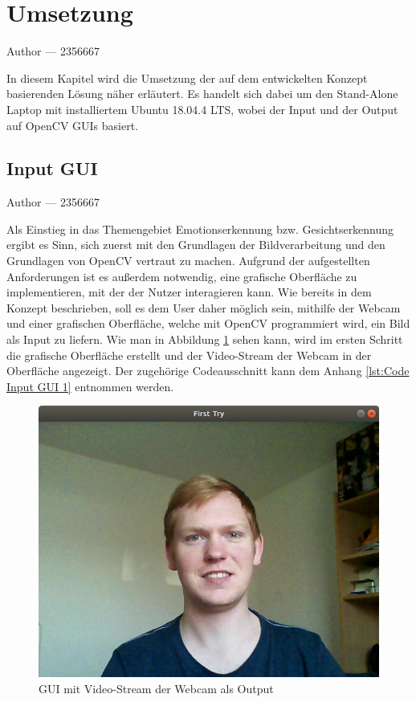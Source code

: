 \documentclass[12pt, a4paper]{report}
\makeatletter
\newcommand{\sectionauthor}[1]{%
  {\parindent0pt\vspace*{-5pt}%
  \large{Author --- }
  \linespread{1.1}\large\scshape#1%
  \par\nobreak\vspace*{35pt} }
  \@afterheading%
}
\makeatother
\begin{document}
\section{Umsetzung}
\sectionauthor{2356667}
In diesem Kapitel wird die Umsetzung der auf dem entwickelten Konzept basierenden Lösung näher erläutert. Es handelt sich dabei um den Stand-Alone Laptop mit installiertem Ubuntu 18.04.4 LTS, wobei der Input und der Output auf OpenCV GUIs basiert.

\subsection{Input GUI}
\sectionauthor{2356667}
Als Einstieg in das Themengebiet Emotionserkennung bzw. Gesichtserkennung ergibt es Sinn, sich zuerst mit den Grundlagen der Bildverarbeitung und den Grundlagen von OpenCV vertraut zu machen. Aufgrund der aufgestellten Anforderungen ist es außerdem notwendig, eine grafische Oberfläche zu implementieren, mit der der Nutzer interagieren kann. Wie bereits in dem Konzept beschrieben, soll es dem User daher möglich sein, mithilfe der Webcam und einer grafischen Oberfläche, welche mit OpenCV programmiert wird, ein Bild als Input zu liefern. Wie man in Abbildung \ref{fig:Input GUI 1} sehen kann, wird im ersten Schritt die grafische Oberfläche erstellt und der Video-Stream der Webcam in der Oberfläche angezeigt. Der zugehörige Codeausschnitt kann dem Anhang \ref{lst:Code Input GUI 1} entnommen werden.
\begin{figure}[h]
\includegraphics[width=\linewidth]{Bilder/InputGUI1.png}
\caption{GUI mit Video-Stream der Webcam als Output}
\label{fig:Input GUI 1}
\end{figure}
\end{document}
